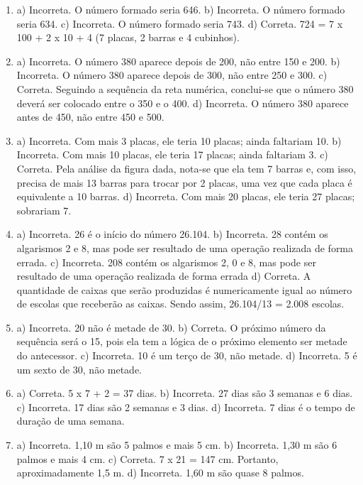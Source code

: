
\begin{enumerate}
\item
a) Incorreta. O número formado seria 646.
b) Incorreta. O número formado seria 634.
c) Incorreta. O número formado seria 743.
d) Correta. 724 = 7 x 100 + 2 x 10 + 4 (7 placas, 2 barras e 4 cubinhos).

\item
a) Incorreta. O número 380 aparece depois de 200, não entre 150 e 200.
b) Incorreta. O número 380 aparece depois de 300, não entre 250 e 300.
c) Correta. Seguindo a sequência da reta numérica, conclui-se que o número 380 deverá ser colocado entre o 350 e o 400.
d) Incorreta. O número 380 aparece antes de 450, não entre 450 e 500.

\item
a) Incorreta. Com mais 3 placas, ele teria 10 placas; ainda faltariam 10.
b) Incorreta. Com mais 10 placas, ele teria 17 placas; ainda faltariam 3.
c) Correta. Pela análise da figura dada, nota-se que ela tem 7 barras e, com isso,
precisa de mais 13 barras para trocar por 2 placas, uma vez que cada placa é equivalente a 10 barras.
d) Incorreta. Com mais 20 placas, ele teria 27 placas; sobrariam 7.

\item
a) Incorreta. 26 é o início do número 26.104.
b) Incorreta. 28 contém os algarismos 2 e 8, mas pode ser resultado de uma operação realizada de forma errada.
c) Incorreta. 208 contém os algarismos 2, 0 e 8, mas pode ser resultado de uma operação realizada de forma errada
d) Correta. A quantidade de caixas que serão produzidas é numericamente igual ao número de
escolas que receberão as caixas. Sendo assim, 26.104/13 = 2.008 escolas.

\item
a) Incorreta. 20 não é metade de 30.
b) Correta. O próximo número da sequência será o 15, pois ela tem a lógica de o próximo
elemento ser metade do antecessor.
c) Incorreta. 10 é um terço de 30, não metade.
d) Incorreta. 5 é um sexto de 30, não metade.

\item
a) Correta. 5 x 7 + 2 = 37 dias.
b) Incorreta. 27 dias são 3 semanas e 6 dias.
c) Incorreta. 17 dias são 2 semanas e 3 dias.
d) Incorreta. 7 dias é o tempo de duração de uma semana.

\item
a) Incorreta. 1,10 m são 5 palmos e mais 5 cm.
b) Incorreta. 1,30 m são 6 palmos e mais 4 cm. 
c) Correta. 7 x 21 = 147 cm. Portanto, aproximadamente 1,5 m.
d) Incorreta. 1,60 m são quase 8 palmos.


\end{enumerate}
